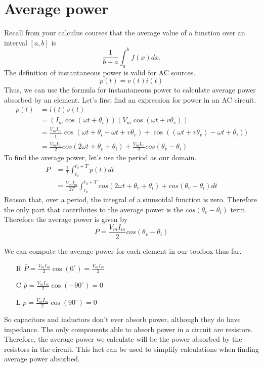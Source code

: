 \documentclass[nobib]{tufte-handout}
\begin{document}
\section{Average power}
Recall from your calculus courses that 
the average value of a function over 
an interval $[a,b]$ is
\[\frac{1}{b-a} \int_{a}^{b} f(x) dx.\]
The definition of instantaneous 
power is valid for AC sources. 
\[p(t) = v(t)i(t)\]
Thus, we can use the formula for instantaneous 
power to calculate average power absorbed 
by an element. Let's first find 
an expression for power in an AC circuit. 
\begin{align*}
    p(t) &= i(t)v(t) \\
    &= (I_m \cos(\omega t + \theta_i)) (V_m \cos(\omega t +v\theta_v)) \\
    &= \frac{V_m I_m} (\cos(\omega t + \theta_i + \omega t +v\theta_v) + \cos((\omega t +v\theta_v) - \omega t + \theta_i)) \\
    &= \frac{V_m I_m}{2} cos(2 \omega t + \theta_v + \theta_i) + \frac{V_m I_m}{2} cos(\theta_v - \theta_i)
\end{align*}
To find the average power, let's use the period as our domain. 
\begin{align*}
    P &= \frac{1}{T} \int_{t_0}^{t_0 + T} p(t) dt \\
    &= \frac{V_m I_m}{2T} \int_{t_0}^{t_0 + T} cos(2 \omega t + \theta_v + \theta_i) + cos(\theta_v - \theta_i) dt
\end{align*}
Reason that, over a period, the integral of a sinusoidal
function is zero. Therefore the only part that contributes to 
the average power is the $cos(\theta_v - \theta_i)$ term. 
Therefore the average power is given by 
\[P = \frac{V_m I_m}{2} cos(\theta_v - \theta_i)\]

We can compute the average power for each element in our toolbox thus far. 
\begin{enumerate}
    \item[R] $\bar{P} = \frac{V_m I_m}{2}\cos(0^\circ) = \frac{V_m I_m}{2}$ 
    \item[C] $\bar{p} = \frac{V_m I_m}{2}\cos(-90^\circ) = 0$ 
    \item[L] $\bar{p} = \frac{V_m I_m}{2}\cos(90^\circ) = 0$ 
\end{enumerate}
So capacitors and inductors don't ever absorb power, although they do have impedance. 
The only components able to absorb power in a circuit are resistors. Therefore, the 
average power we calculate will be the power absorbed by the resistors in the circuit. 
This fact can be used to simplify calculations when finding average power absorbed. 
\end{document}
